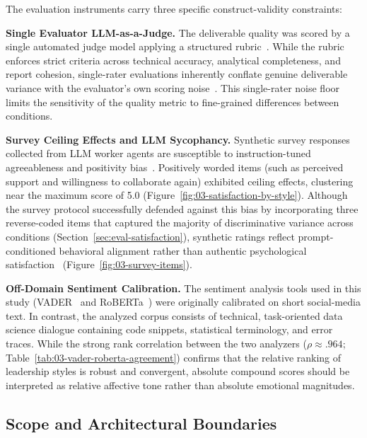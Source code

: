 The evaluation instruments carry three specific construct-validity constraints:

\textbf{Single Evaluator \ac{LLM}-as-a-Judge.}
The deliverable quality was scored by a single automated judge model applying a structured rubric~\cite{zheng2023judgingllmasajudgemtbenchchatbot}.
While the rubric enforces strict criteria across technical accuracy, analytical completeness, and report cohesion, single-rater evaluations inherently conflate genuine deliverable variance with the evaluator's own scoring noise~\cite{zheng2023judgingllmasajudgemtbenchchatbot, chen2025multiagentasjudgealigningllmagentbasedautomated}.
This single-rater noise floor limits the sensitivity of the quality metric to fine-grained differences between conditions.

\textbf{Survey Ceiling Effects and \ac{LLM} Sycophancy.}
Synthetic survey responses collected from \ac{LLM} worker agents are susceptible to instruction-tuned agreeableness and positivity bias~\cite{dominguezolmedo2024questioningsurveyresponseslarge}.
Positively worded items (such as perceived support and willingness to collaborate again) exhibited ceiling effects, clustering near the maximum score of 5.0 (Figure~\ref{fig:03-satisfaction-by-style}).
Although the survey protocol successfully defended against this bias by incorporating three reverse-coded items that captured the majority of discriminative variance across conditions (Section~\ref{sec:eval-satisfaction}), synthetic ratings reflect prompt-conditioned behavioral alignment rather than authentic psychological satisfaction~\cite{dominguezolmedo2024questioningsurveyresponseslarge} (Figure~\ref{fig:03-survey-items}).

\textbf{Off-Domain Sentiment Calibration.}
The sentiment analysis tools used in this study (\ac{VADER}~\cite{hutto2014vader} and \ac{RoBERTa}~\cite{loureiro2022timelmsdiachroniclanguagemodels}) were originally calibrated on short social-media text.
In contrast, the analyzed corpus consists of technical, task-oriented data science dialogue containing code snippets, statistical terminology, and error traces.
While the strong rank correlation between the two analyzers ($\rho \approx .964$; Table~\ref{tab:03-vader-roberta-agreement}) confirms that the relative ranking of leadership styles is robust and convergent, absolute compound scores should be interpreted as relative affective tone rather than absolute emotional magnitudes.

\subsection{Scope and Architectural Boundaries}

